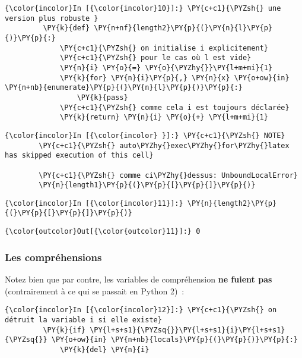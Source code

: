     \begin{Verbatim}[commandchars=\\\{\}]
{\color{incolor}In [{\color{incolor}10}]:} \PY{c+c1}{\PYZsh{} une version plus robuste }
         \PY{k}{def} \PY{n+nf}{length2}\PY{p}{(}\PY{n}{l}\PY{p}{)}\PY{p}{:}
             \PY{c+c1}{\PYZsh{} on initialise i explicitement}
             \PY{c+c1}{\PYZsh{} pour le cas où l est vide}
             \PY{n}{i} \PY{o}{=} \PY{o}{\PYZhy{}}\PY{l+m+mi}{1}
             \PY{k}{for} \PY{n}{i}\PY{p}{,} \PY{n}{x} \PY{o+ow}{in} \PY{n+nb}{enumerate}\PY{p}{(}\PY{n}{l}\PY{p}{)}\PY{p}{:}
                 \PY{k}{pass}
             \PY{c+c1}{\PYZsh{} comme cela i est toujours déclarée}
             \PY{k}{return} \PY{n}{i} \PY{o}{+} \PY{l+m+mi}{1}
\end{Verbatim}


    \begin{Verbatim}[commandchars=\\\{\}]
{\color{incolor}In [{\color{incolor} }]:} \PY{c+c1}{\PYZsh{} NOTE}
        \PY{c+c1}{\PYZsh{} auto\PYZhy{}exec\PYZhy{}for\PYZhy{}latex has skipped execution of this cell}
        
        \PY{c+c1}{\PYZsh{} comme ci\PYZhy{}dessus: UnboundLocalError}
        \PY{n}{length1}\PY{p}{(}\PY{p}{[}\PY{p}{]}\PY{p}{)}
\end{Verbatim}


    \begin{Verbatim}[commandchars=\\\{\}]
{\color{incolor}In [{\color{incolor}11}]:} \PY{n}{length2}\PY{p}{(}\PY{p}{[}\PY{p}{]}\PY{p}{)}
\end{Verbatim}


\begin{Verbatim}[commandchars=\\\{\}]
{\color{outcolor}Out[{\color{outcolor}11}]:} 0
\end{Verbatim}
            
    \hypertarget{les-compruxe9hensions}{%
\subsubsection{Les compréhensions}\label{les-compruxe9hensions}}

    Notez bien que par contre, les variables de compréhension \textbf{ne
fuient pas} (contrairement à ce qui se passait en Python 2)~:

    \begin{Verbatim}[commandchars=\\\{\}]
{\color{incolor}In [{\color{incolor}12}]:} \PY{c+c1}{\PYZsh{} on détruit la variable i si elle existe}
         \PY{k}{if} \PY{l+s+s1}{\PYZsq{}}\PY{l+s+s1}{i}\PY{l+s+s1}{\PYZsq{}} \PY{o+ow}{in} \PY{n+nb}{locals}\PY{p}{(}\PY{p}{)}\PY{p}{:} 
             \PY{k}{del} \PY{n}{i}   
\end{Verbatim}


